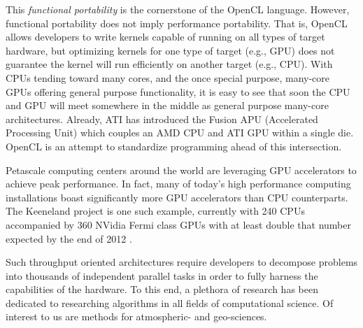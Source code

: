 This \textit{functional portability} is the cornerstone of the OpenCL language. However, functional portability does not imply performance portability. That is, OpenCL allows developers to write kernels capable of running on all types of target hardware, but optimizing kernels for one type of target (e.g., GPU) does not guarantee the kernel will run efficiently on another target (e.g., CPU).
With CPUs tending toward many cores, and the once special purpose, many-core GPUs offering general purpose functionality, it is easy to see that soon the CPU and GPU will meet somewhere in the middle as general purpose many-core architectures. Already, ATI has introduced the Fusion APU (Accelerated Processing Unit) which couples an AMD CPU and ATI GPU within a single die. OpenCL is an attempt to standardize programming ahead of this intersection. 


Petascale computing centers around the world are leveraging GPU accelerators to achieve peak performance. In fact, many of today's high performance computing installations boast significantly more GPU accelerators than CPU counterparts. The Keeneland project is one such example, currently with 240 CPUs accompanied by 360 NVidia Fermi class GPUs with at least double that number expected by the end of 2012 \cite{Vetter2011}. 

Such throughput oriented architectures require developers to decompose problems into thousands of independent parallel tasks in order to fully harness the capabilities of the hardware. To this end, a plethora of research has been dedicated to researching algorithms in all fields of computational science. Of interest to us are methods for atmospheric- and geo-sciences. 
